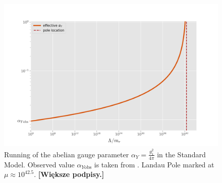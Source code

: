 \documentclass[11pt, a4paper]{article}
\newcommand{\jhkbf}[1]{\textbf{\color{red} [#1]}}
\begin{document}
\begin{figure}[H]
    \includegraphics[width=1\textwidth]{./figures/plotr.jpg}
    \caption{Running of the abelian gauge parameter $\alpha_{Y} = \frac{g_1^2}{4\pi}$ in the Standard Model. Observed value $\alpha_{Y\text{obs}}$ is taken from \cite{pdg}. 
    Landau Pole marked at $\mu \approx 10^{42.5}$. \jhkbf{Większe podpisy.}}
    \label{boxes}
\end{figure}
\end{document}
